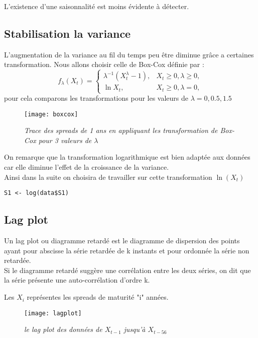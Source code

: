     L'existence d'une saisonnalité est moins évidente  à détecter. 

    \subsection{Stabilisation la variance}
    L'augmentation de la variance au fil du temps peu être diminue grâce a
    certaines transformation. Nous allons choisir celle  de Box-Cox définie par :
    \[
        f_\lambda(X_t)=
        \begin{cases}
            \lambda^{-1}(X_t^\lambda - 1), & X_t \geq 0,\lambda \ge 0, \\
            \ln X_t,                       & X_t \ge  0,\lambda  =   0,
        \end{cases}
    \]
    pour cela comparons les transformations pour les valeurs de
    $\lambda=0,0.5,1.5$
    \begin{figure}[H]
        \centering 
        \label{fig:Boxcox} 
        \texttt{[image: boxcox]} 
        \caption{\it Trace des spreads de 1 ans en appliquant les
        transformation de Box-Cox pour 3 valeurs de $\lambda$ } 
    \end{figure} 
    On remarque que la transformation logarithmique est bien adaptée  aux
    données car elle diminue l'effet de la croissance de la variance.\\
    Ainsi dans la suite on choisira de travailler sur cette transformation
    $\ln(X_t)$


\begin{verbatim}
S1 <- log(data$S1)
\end{verbatim}

    \subsection{Lag plot}
    Un lag plot ou diagramme retardé est le diagramme de dispersion 
    des points ayant pour abscisse la série retardée de k instants 
    et pour ordonnée la série non retardée.\\ 
    Si le diagramme retardé suggère une corrélation entre les deux séries, 
    on dit que la série présente une auto-corrélation d’ordre k.

    Les $X_i$ représentes les spreads de maturité "i" années.
    \begin{figure}[H] 
        \begin{center} 
            \texttt{[image: lagplot]} 
        \end{center} 
        \caption{\it le lag plot des données de $X_{t-1}$ jusqu'à $X_{t-56}$} 
        \label{fig:lagplot} 
    \end{figure}

